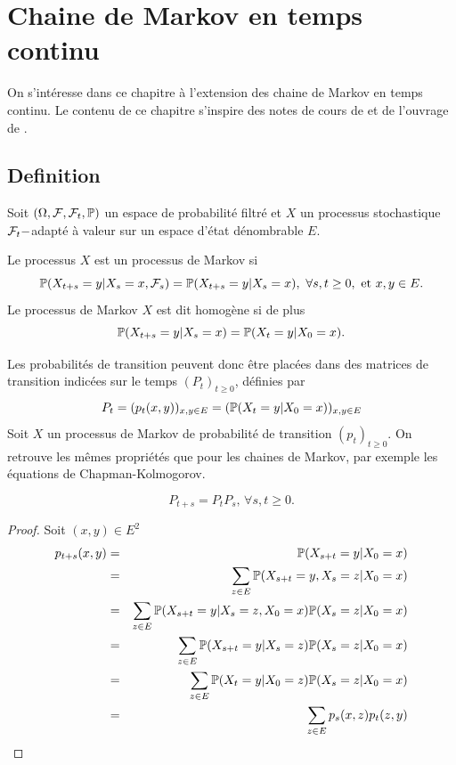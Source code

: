 
\chapter{Chaine de Markov en temps continu}\label{chap:processus_markov}
On s'intéresse dans ce chapitre à l'extension des chaine de Markov en temps continu. Le contenu de ce chapitre s'inspire des notes de cours de \citet{Truquet_stat_proc} et de l'ouvrage de \citet{Dobrow2016}.
\section{Definition}
Soit $(\Omega, \mathcal{F},\mathcal{F}_t,\mathbb{P})$ un espace de probabilité filtré et $X$ un processus stochastique $\mathcal{F}_t-$adapté à valeur sur un espace d'état dénombrable $E$.
\begin{definition}
Le processus $X$ est un processus de Markov si 
$$
\mathbb{P}(X_{t+s} = y|X_s = x, \mathcal{F}_s) = \mathbb{P}(X_{t+s} = y|X_s = x),\text{ }\forall s,t\geq 0,\text{ et }x,y \in E.
$$
Le processus de Markov $X$ est dit homogène si de plus
$$
\mathbb{P}(X_{t+s} = y|X_s = x) = \mathbb{P}(X_{t} = y|X_0 = x).
$$
\end{definition} 
Les probabilités de transition peuvent donc être placées dans des matrices de transition indicées sur le temps $(P_t)_{t\geq 0}$, définies par 
$$
P_t = (p_t(x,y))_{x,y\in E} = (\mathbb{P}(X_t = y|X_0 = x))_{x,y\in E}
$$
Soit $X$ un processus de Markov de probabilité de transition $(p_t)_{t\geq0}$. On retrouve les mêmes propriétés que pour les chaines de Markov, par exemple les équations de Chapman-Kolmogorov.
\begin{prop}\label{prop:CK}
$$
P_{t+s} = P_{t}P_s\text{, }\forall s,t\geq0.
$$
\end{prop}
\begin{proof}
Soit $(x,y)\in E^2$
\begin{eqnarray*}
p_{t+s}(x,y) &=& \mathbb{P}(X_{s+t} = y|X_0 = x)\\
&=&\sum_{z\in E}\mathbb{P}(X_{s+t} = y,X_{s} = z|X_0 = x)\\
&=&\sum_{z\in E}\mathbb{P}(X_{s+t} = y|X_{s} = z,X_0 = x)\mathbb{P}(X_{s} = z|X_0 = x)\\
&=&\sum_{z\in E}\mathbb{P}(X_{s+t} = y|X_{s} = z)\mathbb{P}(X_{s} = z|X_0 = x)\\
&=&\sum_{z\in E}\mathbb{P}(X_{t} = y|X_{0} = z)\mathbb{P}(X_{s} = z|X_0 = x)\\
&=&\sum_{z\in E}p_s(x,z)p_t(z,y)\\
\end{eqnarray*}
\end{proof}
